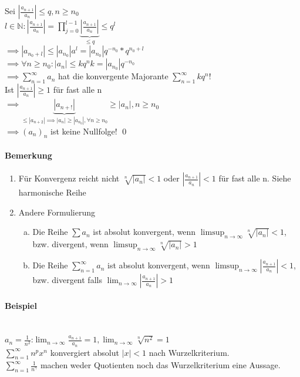 \documentclass[fleqn]{scrbook}
\newcommand{\sumOI}{\sum_{n=1}^{\infty}}
\renewenvironment{proof}{{\bfseries Beweis }}{\qed}
\begin{document}
\begin{proof}
Sei $|\frac{a_{n+1}}{a_n}| \leq q, n \geq n_0$\\
$l \in \mathbb{N}: |\frac{a_{n+1}}{a_n}| = \prod_{j=0}^{l-1} \underbrace{|\frac{a_{n+1}}{a_n}|}_{\leq q} \leq q^l$\\
$\implies |a_{n_0 + l}| \leq |a_{n_0}|a^l = |a_{n_0}|q^{-n_0} * q^{n_0 + l}$\\
$\implies \forall n \geq n_0: |a_n| \leq k q^n k = |a_{n_0}| q^{-n_0}$\\
$\implies \sumOI a_n$ hat die konvergente Majorante $\sumOI k q^n$!\\
Ist $|\frac{a_{n+1}}{a_n}| \geq 1$ für fast alle n\\
$\implies \underbrace{|a_{n+!}|}_{\leq |a_{n+2}| \implies |a_n| \geq |a_{n_0}|, \forall n\geq n_0} \geq |a_n|, n \geq n_0$\\
$\implies (a_n)_n$ ist keine Nullfolge!
\end{proof}
\paragraph{Bemerkung}
\begin{enumerate}[1)]
  \item Für Konvergenz reicht nicht $\sqrt[n]{|a_n|} < 1$ oder $|\frac{a_{n+1}}{a_n}| < 1$ für fast alle n. Siehe harmonische Reihe
  \item Andere Formulierung
\begin{enumerate}[a)]
  \item Die Reihe $\sum a_n$ ist absolut konvergent, wenn $\limsup_{n\rightarrow\infty} \sqrt[n]{|a_n|} < 1$, bzw. divergent, wenn $\limsup_{n\rightarrow\infty} \sqrt[n]{|a_n|} > 1$
  \item Die Reihe $\sumOI a_n$ ist absolut konvergent, wenn $\limsup_{n\rightarrow\infty} |\frac{a_{n+1}}{a_n}| < 1$, bzw. divergent falls $\lim_{n\rightarrow\infty} |\frac{a_{n+1}}{a_n}| > 1$
\end{enumerate}
\end{enumerate}
\paragraph{Beispiel}$ $\\
$a_n = \frac{1}{n^2}$:$\lim_{n\rightarrow\infty} \frac{a_{n+1}}{a_n} = 1, \lim_{n\rightarrow\infty} \sqrt[n]{n^2} = 1$\\
$\sumOI n^px^n$ konvergiert absolut $|x|<1$ nach Wurzelkriterium.\\
$\sumOI \frac{1}{n^\gamma}$ machen weder Quotienten noch das Wurzelkriterium eine Aussage.
\end{document}
